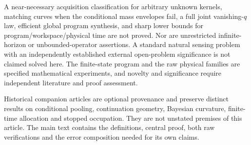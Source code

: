 A near-necessary acquisition classification for arbitrary unknown kernels, matching curves when the conditional mass envelopes fail, a full joint vanishing-$q$ law, efficient global program synthesis, and sharp lower bounds for program/workspace/physical time are not proved. Nor are unrestricted infinite-horizon or unbounded-operator assertions. A standard natural sensing problem with an independently established external open-problem significance is not claimed solved here. The finite-state program and the raw physical families are specified mathematical experiments, and novelty and significance require independent literature and proof assessment.

Historical companion articles are optional provenance and preserve distinct results on conditional pooling, continuation geometry, Bayesian curvature, finite-time allocation and stopped occupation. They are not unstated premises of this article. The main text contains the definitions, central proof, both raw verifications and the error composition needed for its own claims.
